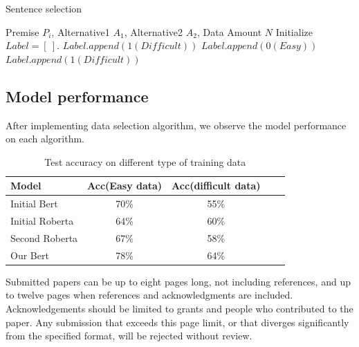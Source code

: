 \documentclass{article}
\begin{document}
\begin{algorithm}[tb]
   \caption{Sentence selection}
   \label{alg:example}
\begin{algorithmic}
    Premise $P_i$, Alternative1 $A_1$, Alternative2 $A_2$, Data Amount $N$
   \REPEAT
   \STATE Initialize $Label = [\ ]$.
  \STATE $Label.append(1(Difficult))$
   \STATE $Label.append(0(Easy))$
   \STATE $Label.append(1(Difficult))$
   \ENDIF
   \ENDIF
   \ENDFOR
\end{algorithmic}
\end{algorithm}
\subsection{Model performance}
After implementing data selection algorithm, we observe the model performance on each algorithm. 
\begin{table}[t]
\caption{Test accuracy on different type of training data}
\label{sample-table}
\vskip 0.15in
\begin{center}
\begin{small}
\begin{sc}
\begin{tabular}{lcccr}
\toprule
Model & Acc(Easy data) & Acc(difficult data)  \\
\midrule
Initial Bert    & 70\% & 55\% \\
Initial Roberta    & 64\% & 60\% \\
Second Roberta    & 67\% & 58\% \\
Our Bert        & 78\% & 64\% \\

\bottomrule
\end{tabular}
\end{sc}
\end{small}
\end{center}
\vskip -0.1in
\end{table}

Submitted papers can be up to eight pages long, not including references, and up to twelve pages when references and acknowledgments are included.
Acknowledgements should be limited to grants and people who contributed to the paper.
Any submission that exceeds
this page limit, or that diverges significantly from the specified format,
will be rejected without review.
\end{document}
